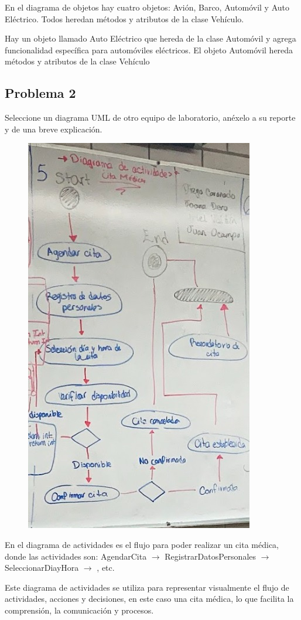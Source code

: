 \documentclass[11pt, twocolumn]{article}
\begin{document}
  En el diagrama de objetos hay cuatro objetos: Avión, Barco, Automóvil y Auto Eléctrico. Todos heredan métodos y atributos de la clase Vehículo.

  Hay un objeto llamado Auto Eléctrico que hereda de la clase Automóvil y agrega funcionalidad específica para automóviles eléctricos. El objeto Automóvil hereda métodos y atributos de la clase Vehículo


  \subsection*{Problema 2}
  Seleccione un diagrama UML de otro equipo de laboratorio, anéxelo a su reporte y de una breve explicación.

  \begin{figure}[h!]
    \centering
    \includegraphics[width=0.6\linewidth]{9P2.jpg}
  \end{figure}

  En el diagrama de actividades es el flujo para poder realizar un cita médica, donde las actividades son: AgendarCita $\longrightarrow$ RegistrarDatosPersonales $\longrightarrow$ SeleccionarDiayHora $\longrightarrow$ , etc.

  Este diagrama de actividades se utiliza para representar visualmente el flujo de actividades, acciones y decisiones, en este caso una cita médica, lo que facilita la comprensión, la comunicación y procesos.
\end{document}
